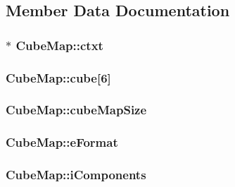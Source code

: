 \subsection{Member Data Documentation}
\hypertarget{class_cube_map_a37eeec01f385c159dd652b7cff226ab4}{
\subsubsection[{ctxt}]{$\ast$ Cube\-Map\-::ctxt}}\label{class_cube_map_a37eeec01f385c159dd652b7cff226ab4}
\hypertarget{class_cube_map_a09b48ee002d41d837644b184ad75a90a}{
\subsubsection[{cube}]{ Cube\-Map\-::cube\mbox{[}6\mbox{]}}}\label{class_cube_map_a09b48ee002d41d837644b184ad75a90a}
\hypertarget{class_cube_map_a5f81bc369363527e34b462012cbdedc7}{
\subsubsection[{cube\-Map\-Size}]{ Cube\-Map\-::cube\-Map\-Size}}\label{class_cube_map_a5f81bc369363527e34b462012cbdedc7}
\hypertarget{class_cube_map_a44d26ee234cbd099bd9d39530fc6fa5d}{
\subsubsection[{e\-Format}]{ Cube\-Map\-::e\-Format}}\label{class_cube_map_a44d26ee234cbd099bd9d39530fc6fa5d}
\hypertarget{class_cube_map_a1c8ecc664fe6e56659aff49dfb24fa2a}{
\subsubsection[{i\-Components}]{ Cube\-Map\-::i\-Components}}\label{class_cube_map_a1c8ecc664fe6e56659aff49dfb24fa2a}
